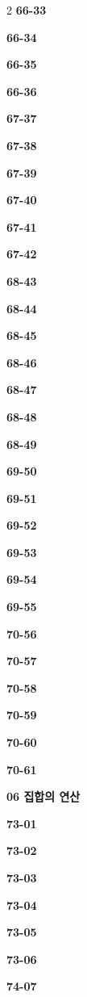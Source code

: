 \documentclass[10pt,a4paper]{article}
\begin{document}
\begin{multicols}{2}
\noindent\textbf{66-33}\ \par
\noindent\textbf{66-34}\ \par
\noindent\textbf{66-35}\ \par
\noindent\textbf{66-36}\ \par
\noindent\textbf{67-37}\ \par
\noindent\textbf{67-38}\ \par
\noindent\textbf{67-39}\ \par
\noindent\textbf{67-40}\ \par
\noindent\textbf{67-41}\ \par
\noindent\textbf{67-42}\ \par
\noindent\textbf{68-43}\ \par
\noindent\textbf{68-44}\ \par
\noindent\textbf{68-45}\ \par
\noindent\textbf{68-46}\ \par
\noindent\textbf{68-47}\ \par
\noindent\textbf{68-48}\ \par
\noindent\textbf{68-49}\ \par
\noindent\textbf{69-50}\ \par
\noindent\textbf{69-51}\ \par
\noindent\textbf{69-52}\ \par
\noindent\textbf{69-53}\ \par
\noindent\textbf{69-54}\ \par
\noindent\textbf{69-55}\ \par
\noindent\textbf{70-56}\ \par
\noindent\textbf{70-57}\ \par
\noindent\textbf{70-58}\ \par
\noindent\textbf{70-59}\ \par
\noindent\textbf{70-60}\ \par
\noindent\textbf{70-61}\ \par
\noindent\textbf{06 집합의 연산}\par\smallskip
\noindent\textbf{73-01}\ \par
\noindent\textbf{73-02}\ \par
\noindent\textbf{73-03}\ \par
\noindent\textbf{73-04}\ \par
\noindent\textbf{73-05}\ \par
\noindent\textbf{73-06}\ \par
\noindent\textbf{74-07}\ \par

\end{multicols}
\end{document}
